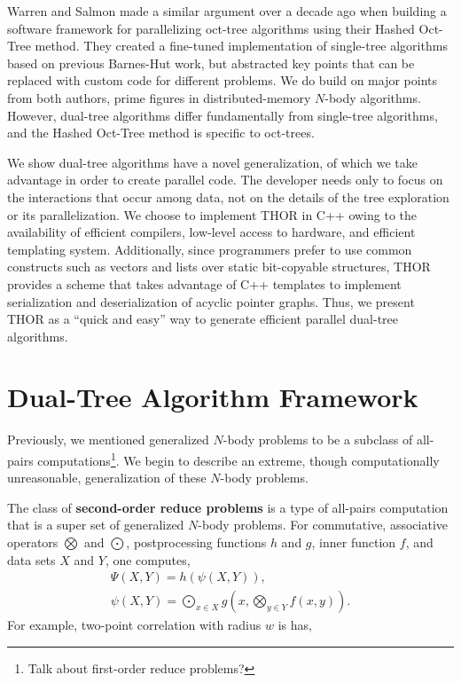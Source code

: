 \documentclass[twoside,leqno,twocolumn]{article}
\newcommand{\Gnp}{\Psi}
\newcommand{\gnp}{\psi}
\newcommand{\defterm}[1]{{\bf #1}}
\begin{document}
Warren and Salmon\cite{warren95portable} made a similar argument over a decade ago when building a software framework for parallelizing oct-tree algorithms using their Hashed Oct-Tree method.
They created a fine-tuned implementation of single-tree algorithms based on previous Barnes-Hut work, but abstracted key points that can be replaced with custom code for different problems.
We do build on major points from both authors, prime figures in distributed-memory $N$-body algorithms.
However, dual-tree algorithms differ fundamentally from single-tree algorithms, and the Hashed Oct-Tree method is specific to oct-trees.

We show dual-tree algorithms have a novel generalization, of which we take advantage in order to create parallel code.
The developer needs only to focus on the interactions that occur among data, not on the details of the tree exploration or its parallelization.
We choose to implement THOR in C++ owing to the availability of efficient compilers, low-level access to hardware, and efficient templating system.
Additionally, since programmers prefer to use common constructs such as vectors and lists over static bit-copyable structures, THOR provides a scheme that takes advantage of C++ templates to implement serialization and deserialization of acyclic pointer graphs.
Thus, we present THOR as a ``quick and easy'' way to generate efficient parallel dual-tree algorithms.

\section{Dual-Tree Algorithm Framework}

Previously, we mentioned generalized $N$-body problems to be a subclass of all-pairs computations\footnote{Talk about first-order reduce problems?}.
We begin to describe an extreme, though computationally unreasonable, generalization of these $N$-body problems.

The class of \defterm{second-order reduce problems} is a type of all-pairs computation that is a super set of generalized $N$-body problems.
For commutative, associative operators $\bigotimes$ and $\bigodot$, postprocessing functions $h$ and $g$, inner function $f$, and data sets $X$ and $Y$, one computes,
\[\begin{array}{l}
  \displaystyle \Gnp(X, Y) = h(\gnp(X, Y)),
  \\
  \displaystyle \gnp(X, Y) = \bigodot_{x \in X} g\!\left(x, \bigotimes_{y \in Y} f(x, y) \right).
\end{array}\]
\noindent
For example, two-point correlation with radius $w$ is has,
\end{document}
